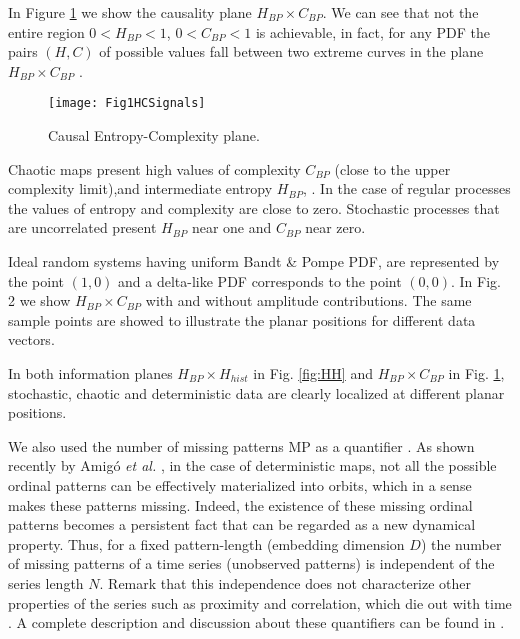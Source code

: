 In Figure \ref{fig:HC} we show the causality plane $H_{BP} \times C_{BP}$.
We can see that not the entire region $0<H_{BP}<1$, $0<C_{BP}<1$ is achievable, in fact, for any PDF the pairs $(H,C)$ of possible values fall between two extreme curves in the plane $H_{BP} \times C_{BP}$ \cite{Anteneodo1996}.
\begin{figure}[htpb]
	\centering		
	\texttt{[image: Fig1HCSignals]}
	\caption{Causal Entropy-Complexity plane.}
	\label{fig:HC}
\end{figure}

Chaotic maps present high values of complexity $C_{BP}$ (close to the upper complexity limit),and intermediate entropy $H_{BP}$, \cite{Rosso2007,Olivares2012}.
In the case of regular processes the values of entropy and complexity are close to zero. 
Stochastic processes that are uncorrelated present $H_{BP}$ near one and $C_{BP}$ near zero.

Ideal random systems having uniform Bandt \& Pompe PDF, are represented by the point $(1,0)$ \cite{Gonzalez2005} and a delta-like PDF corresponds to the point $(0,0)$.
In Fig. 2 we show $H_{BP} \times C_{BP}$ with and without amplitude contributions.
The same sample points are showed to illustrate the planar positions for different data vectors.

In both information planes $H_{BP} \times H_{hist}$ in Fig. \ref{fig:HH} and $H_{BP} \times C_{BP}$ in Fig. \ref{fig:HC}, stochastic, chaotic and deterministic data are clearly localized at different planar positions.

We also used the number of missing patterns MP as a quantifier \cite{Rosso2012}.
As shown recently by Amig\'o {\it et al.} \cite{Amigo2006,Amigo2007,Amigo2008,Amigo2010}, in the case of deterministic maps, not all the possible ordinal patterns can be effectively materialized into orbits, which in a sense makes these patterns missing.
Indeed, the existence of these missing ordinal patterns becomes a persistent fact that can be regarded as a new dynamical property.
Thus, for a fixed pattern-length (embedding dimension $D$) the number of missing patterns of a time series (unobserved patterns) is independent of the series length $N$.
Remark that this independence does not characterize other properties of the series such as proximity and correlation, which die out with time \cite{Amigo2007,Amigo2010}.
A complete description and discussion about these quantifiers can be found in \cite{DeMicco2014,DeMicco2008,Rosso2010,Rosso2012,Lopez-Ruiz1995,Martin2006,Wackerbauer1994,Antonelli2016}.